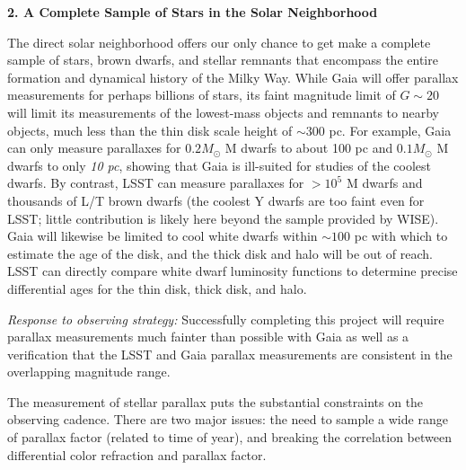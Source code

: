 {\bf 2. A Complete Sample of Stars in the Solar Neighborhood}

The direct solar neighborhood offers our only chance to get make a complete sample of stars, brown dwarfs, and stellar remnants that encompass the entire formation and dynamical history of the Milky Way. While Gaia will offer parallax measurements for perhaps billions of stars, its faint magnitude limit of $G\sim 20$ will limit its measurements of the lowest-mass objects
and remnants to nearby objects, much less than the thin disk scale height of $\sim 300$ pc. For example, Gaia can only measure parallaxes for $0.2 M_{\odot}$ M dwarfs to about 100 pc
and $0.1 M_{\odot}$ M dwarfs to only \emph{10 pc}, showing that Gaia is ill-suited for studies of the coolest dwarfs. By contrast, LSST can measure parallaxes for $> 10^5$ M dwarfs and thousands of L/T brown dwarfs (the coolest Y dwarfs are too faint even for LSST; little contribution is likely here beyond the sample provided by WISE). Gaia will likewise be limited to cool white dwarfs within $\sim 100$ pc with which to estimate the age of the disk, and the thick disk and halo will be out of reach. LSST can directly compare white dwarf luminosity functions to determine precise differential ages for the thin disk, thick disk, and halo.

{\it Response to observing strategy:} Successfully completing this project will require parallax measurements much fainter than possible with Gaia as well as a verification that the LSST and Gaia parallax measurements are consistent in the overlapping magnitude range.

The measurement of stellar parallax puts the substantial constraints on the observing cadence. There are two major issues: the need to sample a wide range of parallax factor (related to time of year), and breaking the correlation between differential color refraction and parallax factor.

